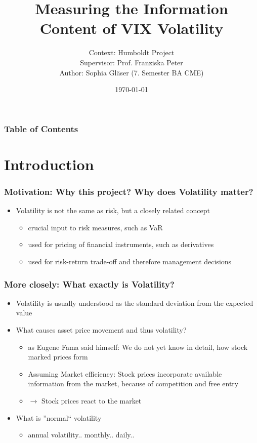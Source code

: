 \documentclass[aspectratio=169]{beamer}
\title{Measuring the Information Content of VIX Volatility}
\author{Context: Humboldt Project\\
Supervisor: Prof. Franziska Peter\\
Author: Sophia Gläser (7. Semester BA CME)}
\date{\small \today}
\begin{document}
\begin{frame}
\maketitle
\end{frame}

\begin{frame}
\frametitle{Table of Contents}
\tableofcontents
\end{frame}

\section{Introduction}

\begin{frame}
\frametitle{Motivation: Why this project? Why does Volatility matter?}
	\begin{itemize}
	\item<1-> Volatility is not the same as risk, but a closely related concept
	\begin{itemize}
	\item<2-> crucial input to risk measures, such as VaR
	\item<2-> used for pricing of financial instruments, such as derivatives
	\item<2-> used for risk-return trade-off and therefore management decisions
	\end{itemize}
	\end{itemize}
\end{frame}

\begin{frame}
\frametitle{More closely: What exactly is Volatility?}
	\begin{itemize}
	\item<1-> Volatility is usually understood as the standard deviation from the expected value 
	\item<1-> What causes asset price movement and thus volatility?
	\begin{itemize}
	\item<2-> as Eugene Fama said himself: We do not yet know in detail, how stock marked prices form 
	\item<2-> Assuming Market efficiency: Stock prices incorporate available information from the market, because of competition and free entry 
	\item<2-> $\rightarrow$ Stock prices react to the market 
	\end{itemize}
	\end{itemize}
	
	\begin{itemize}
	\item<3-> What is ''normal`` volatility
	\begin{itemize}
	\item<4-> annual volatility.. monthly.. daily..
	\end{itemize}
	\end{itemize}
\end{frame}
\end{document}
